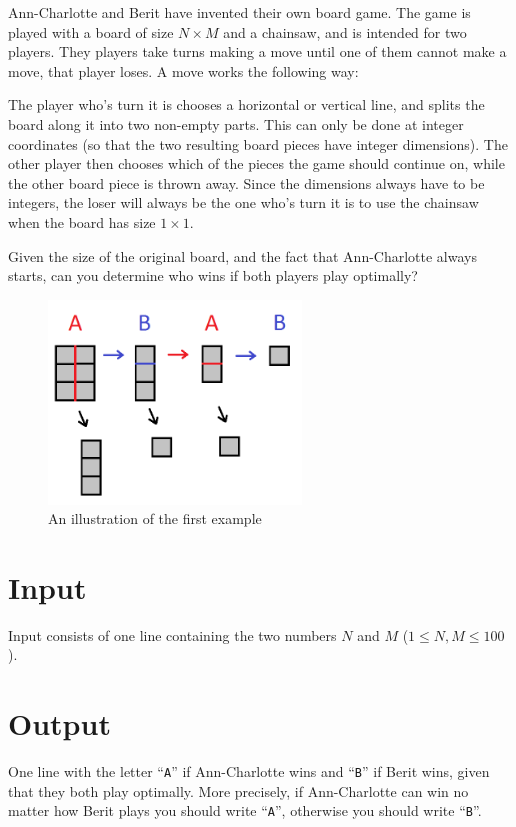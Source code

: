 Ann-Charlotte and Berit have invented their own board game.
The game is played with a board of size $N \times M$ and a chainsaw, and is intended for two players.
They players take turns making a move until one of them cannot make a move, that player loses.
A move works the following way:

The player who's turn it is chooses a horizontal or vertical line, and splits the board along it into two non-empty parts.
This can only be done at integer coordinates (so that the two resulting board pieces have integer dimensions).
The other player then chooses which of the pieces the game should continue on, while the other board piece is thrown away.
Since the dimensions always have to be integers, the loser will always be the one who's turn it is to use the chainsaw when the board has size $1 \times 1$.

Given the size of the original board, and the fact that Ann-Charlotte always starts, can you determine who wins if both players play optimally?

\begin{figure}[ht!]
\centering
\includegraphics[width=0.6\textwidth]{bradspelet.png}
\caption{An illustration of the first example}
\label{overflow}
\end{figure}

\section*{Input}
Input consists of one line containing the two numbers $N$ and $M$ ($1 \le N,M \le 100$).

\section*{Output}
One line with the letter ``\texttt{A}'' if Ann-Charlotte wins and ``\texttt{B}'' if
Berit wins, given that they both play optimally. More precisely, if Ann-Charlotte
can win no matter how Berit plays you should write ``\texttt{A}'', otherwise you
should write ``\texttt{B}''.

